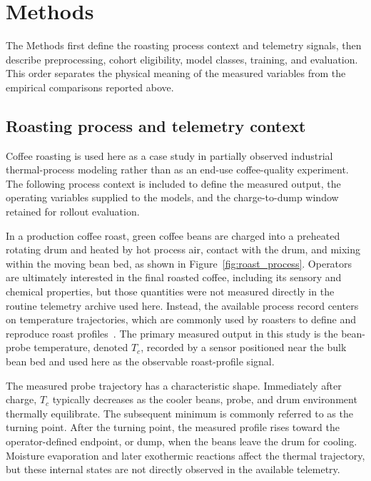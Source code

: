 \documentclass[fleqn,10pt]{wlscirep}
\begin{document}
\section*{Methods}\label{sec:methods}

The Methods first define the roasting process context and telemetry signals, then describe preprocessing, cohort eligibility, model classes, training, and evaluation. This order separates the physical meaning of the measured variables from the empirical comparisons reported above.

\subsection*{Roasting process and telemetry context}

Coffee roasting is used here as a case study in partially observed industrial thermal-process modeling rather than as an end-use coffee-quality experiment. The following process context is included to define the measured output, the operating variables supplied to the models, and the charge-to-dump window retained for rollout evaluation.

In a production coffee roast, green coffee beans are charged into a preheated rotating drum and heated by hot process air, contact with the drum, and mixing within the moving bean bed, as shown in Figure~\ref{fig:roast_process}. Operators are ultimately interested in the final roasted coffee, including its sensory and chemical properties, but those quantities were not measured directly in the routine telemetry archive used here. Instead, the available process record centers on temperature trajectories, which are commonly used by roasters to define and reproduce roast profiles~\cite{rao2014,schwartzberg2002}. The primary measured output in this study is the bean-probe temperature, denoted $T_c$, recorded by a sensor positioned near the bulk bean bed and used here as the observable roast-profile signal.

The measured probe trajectory has a characteristic shape. Immediately after charge, $T_c$ typically decreases as the cooler beans, probe, and drum environment thermally equilibrate. The subsequent minimum is commonly referred to as the turning point. After the turning point, the measured profile rises toward the operator-defined endpoint, or dump, when the beans leave the drum for cooling. Moisture evaporation and later exothermic reactions affect the thermal trajectory, but these internal states are not directly observed in the available telemetry.
\end{document}
